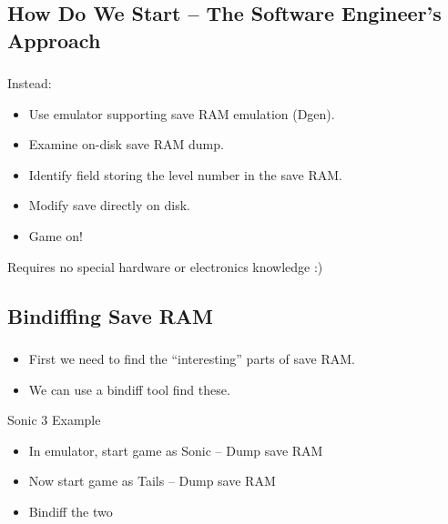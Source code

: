 \documentclass{beamer}
\begin{document}

\subsection{How Do We Start -- The Software Engineer's Approach}
\begin{frame}[fragile]
\frametitle{\insertsubsection}

Instead:

\begin{itemize}
\item Use emulator supporting save RAM emulation (Dgen).
\item Examine on-disk save RAM dump.
\item Identify field storing the level number in the save RAM.
\item Modify save directly on disk.
\item Game on!
\end{itemize}

\vfill

Requires no special hardware or electronics knowledge :)

\end{frame}


\subsection{Bindiffing Save RAM}

\begin{frame}[fragile]
\frametitle{\insertsubsection}

\begin{itemize}
\item First we need to find the ``interesting'' parts of save RAM.
\item We can use a bindiff tool find these.
\end{itemize}

\vfill

\begin{block}{Sonic 3 Example}
\begin{itemize}
\item In emulator, start game as Sonic -- Dump save RAM
\item Now start game as Tails -- Dump save RAM
\item Bindiff the two
\end{itemize}
\end{block}

\end{frame}
\end{document}

